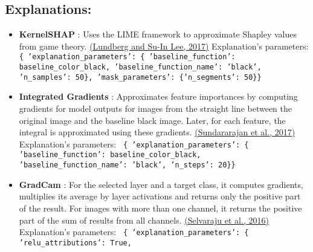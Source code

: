 \documentclass{article}%
\begin{document}
\subsection*{Explanations:}%
\label{subsec:Explanations}%
\begin{itemize}%
\item%
\textbf{KernelSHAP}%
: Uses the LIME framework to approximate Shapley values from game theory.%
\href{https://arxiv.org/abs/1705.07874}{(Lundberg and Su{-}In Lee, 2017)}%
\newline%
%
Explanation's parameters: \newline%
%
\texttt{%
\{   'explanation\_parameters': \{   'baseline\_function': baseline\_color\_black,\newline%
                                  'baseline\_function\_name': 'black',\newline%
                                  'n\_samples': 50\},\newline%
    'mask\_parameters': \{'n\_segments': 50\}\} \newline%
%
}%
\item%
\textbf{Integrated Gradients}%
: Approximates feature importances by computing gradients for model outputs for images from the straight line between the original image and the baseline black image. Later, for each feature, the integral is approximated using these gradients.%
\href{https://arxiv.org/abs/1703.01365}{(Sundararajan et al., 2017)}%
\newline%
%
Explanation's parameters: \newline%
%
\texttt{%
\{   'explanation\_parameters': \{   'baseline\_function': baseline\_color\_black,\newline%
                                  'baseline\_function\_name': 'black',\newline%
                                  'n\_steps': 20\}\} \newline%
%
}%
\item%
\textbf{GradCam}%
:  For the selected layer and a target class, it computes gradients, multiplies its average by layer activations and returns only the positive part of the result. For images with more than one channel, it returns the positive part of the sum of results from all channels.%
\href{https://arxiv.org/abs/1610.02391}{(Selvaraju et al., 2016)}%
\newline%
%
Explanation's parameters: \newline%
%
\texttt{%
\{   'explanation\_parameters': \{   'relu\_attributions': True,\newline%
}
\end{itemize}
\end{document}
